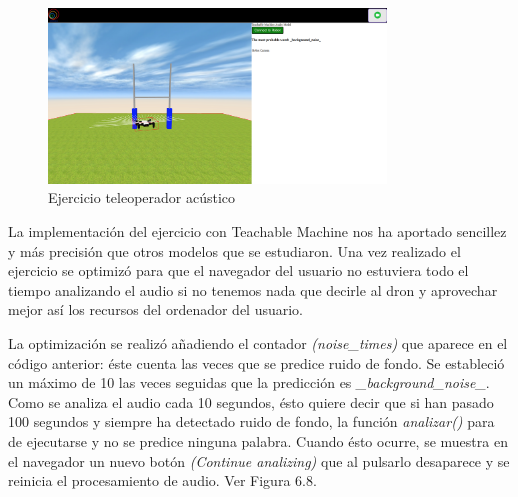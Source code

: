 \begin{figure}[H]
    \centering
    \includegraphics[width=0.8\textwidth, height=0.5\textwidth]{chapters/images/audio.png}
    \caption{Ejercicio teleoperador acústico}
    \label{fig:my_label}
\end{figure}

La implementación del ejercicio con Teachable Machine  nos ha aportado sencillez y más precisión que otros modelos que se estudiaron.
Una vez realizado el ejercicio se optimizó para que el navegador del usuario no estuviera todo el tiempo analizando el  audio si no tenemos nada que decirle al dron y aprovechar mejor así los recursos del ordenador del usuario.

La optimización se realizó añadiendo el contador \textit{(noise\_times)} que aparece en el código anterior: éste cuenta las veces que se predice ruido de fondo. Se estableció un máximo de 10 las veces seguidas que la predicción es \textit{\_background\_noise\_}. Como se analiza el audio cada 10 segundos, ésto quiere decir que si han pasado 100 segundos y siempre ha detectado ruido de fondo, la función \textit{analizar()} para de ejecutarse y no se predice ninguna palabra. Cuando ésto ocurre, se muestra en el navegador un nuevo botón \textit{(Continue analizing)} que al pulsarlo desaparece y se reinicia el procesamiento de audio. Ver Figura 6.8.

